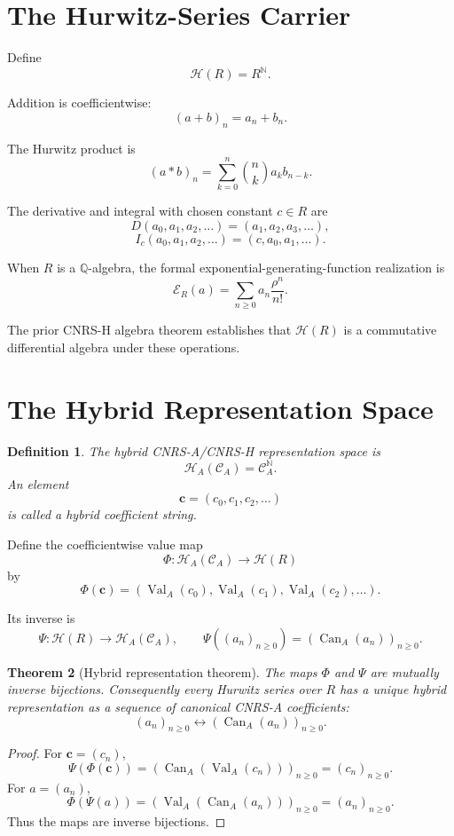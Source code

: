 \documentclass[11pt]{article}
\newtheorem{theorem}{Theorem}[section]
\newtheorem{definition}[theorem]{Definition}
\newcommand{\Q}{\mathbb Q}
\newcommand{\N}{\mathbb N}
\newcommand{\HA}{\mathcal H_A}
\newcommand{\HR}{\mathcal H}
\newcommand{\CA}{\mathcal C_A}
\newcommand{\Val}{\operatorname{Val}_A}
\newcommand{\Can}{\operatorname{Can}_A}
\begin{document}
\section{The Hurwitz-Series Carrier}

Define
\[
\HR(R)=R^\N.
\]

Addition is coefficientwise:
\[
(a+b)_n=a_n+b_n.
\]

The Hurwitz product is
\[
(a*b)_n
=
\sum_{k=0}^n
\binom{n}{k}a_kb_{n-k}.
\]

The derivative and integral with chosen constant $c\in R$ are
\[
D(a_0,a_1,a_2,\ldots)
=
(a_1,a_2,a_3,\ldots),
\]
\[
I_c(a_0,a_1,a_2,\ldots)
=
(c,a_0,a_1,\ldots).
\]

When $R$ is a $\Q$-algebra, the formal exponential-generating-function realization is
\[
\mathcal E_R(a)
=
\sum_{n\ge0}a_n\frac{\rho^n}{n!}.
\]

The prior CNRS-H algebra theorem establishes that $\HR(R)$ is a commutative differential algebra under these operations.

\section{The Hybrid Representation Space}

\begin{definition}
The hybrid CNRS-A/CNRS-H representation space is
\[
\HA(\CA)=\CA^\N.
\]
An element
\[
\mathbf c=(c_0,c_1,c_2,\ldots)
\]
is called a hybrid coefficient string.
\end{definition}

Define the coefficientwise value map
\[
\Phi:\HA(\CA)\to\HR(R)
\]
by
\[
\Phi(\mathbf c)
=
(\Val(c_0),\Val(c_1),\Val(c_2),\ldots).
\]

Its inverse is
\[
\Psi:\HR(R)\to\HA(\CA),
\qquad
\Psi((a_n)_{n\ge0})
=
(\Can(a_n))_{n\ge0}.
\]

\begin{theorem}[Hybrid representation theorem]
The maps $\Phi$ and $\Psi$ are mutually inverse bijections.  Consequently every Hurwitz series over $R$ has a unique hybrid representation as a sequence of canonical CNRS-A coefficients:
\[
(a_n)_{n\ge0}
\longleftrightarrow
(\Can(a_n))_{n\ge0}.
\]
\end{theorem}

\begin{proof}
For $\mathbf c=(c_n)$,
\[
\Psi(\Phi(\mathbf c))
=
(\Can(\Val(c_n)))_{n\ge0}
=
(c_n)_{n\ge0}.
\]
For $a=(a_n)$,
\[
\Phi(\Psi(a))
=
(\Val(\Can(a_n)))_{n\ge0}
=
(a_n)_{n\ge0}.
\]
Thus the maps are inverse bijections.
\end{proof}
\end{document}
